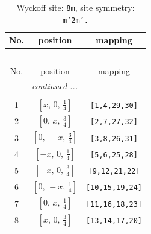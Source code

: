 \documentclass[fleqn,8pt]{jsarticle}
\begin{document}
\begin{longtable}{ccc}
\caption{Wyckoff site: {\tt 8m}, site symmetry: {\tt m'2m'.}}
 \\
 \hline \hline
No. & position & mapping \\ \hline \endfirsthead

\multicolumn{2}{l}{\tablename\ \thetable{}} \\
 \hline \hline
No. & position & mapping \\ \hline \endhead

 \hline \hline
\multicolumn{2}{r}{\footnotesize\it continued ...} \\ \endfoot

 \hline \hline
\multicolumn{2}{r}{} \\ \endlastfoot

1 & $\left[ x,\, 0,\, \frac{1}{4} \right]$ & {\tt [1,4,29,30]} \\ \hline
2 & $\left[ 0,\, x,\, \frac{3}{4} \right]$ & {\tt [2,7,27,32]} \\ \hline
3 & $\left[ 0,\, - x,\, \frac{3}{4} \right]$ & {\tt [3,8,26,31]} \\ \hline
4 & $\left[ - x,\, 0,\, \frac{1}{4} \right]$ & {\tt [5,6,25,28]} \\ \hline
5 & $\left[ - x,\, 0,\, \frac{3}{4} \right]$ & {\tt [9,12,21,22]} \\ \hline
6 & $\left[ 0,\, - x,\, \frac{1}{4} \right]$ & {\tt [10,15,19,24]} \\ \hline
7 & $\left[ 0,\, x,\, \frac{1}{4} \right]$ & {\tt [11,16,18,23]} \\ \hline
8 & $\left[ x,\, 0,\, \frac{3}{4} \right]$ & {\tt [13,14,17,20]} \\
\end{longtable}
\renewcommand{\arraystretch}{1.2}
\end{document}
